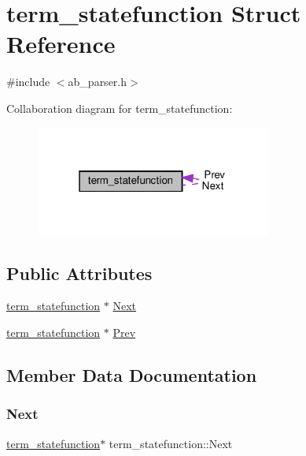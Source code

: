\hypertarget{structterm__statefunction}{}\section{term\+\_\+statefunction Struct Reference}
\label{structterm__statefunction}


{\ttfamily \#include $<$ab\+\_\+parser.\+h$>$}



Collaboration diagram for term\+\_\+statefunction\+:\nopagebreak
\begin{figure}[H]
\begin{center}
\leavevmode
\includegraphics[width=220pt]{dd/d3e/structterm__statefunction__coll__graph}
\end{center}
\end{figure}
\subsection*{Public Attributes}
\begin{DoxyCompactItemize}
\item 
\hyperlink{structterm__statefunction}{term\+\_\+statefunction} $\ast$ \hyperlink{structterm__statefunction_a326dae1852433ae2fc11195dd1770ddf}{Next}
\item 
\hyperlink{structterm__statefunction}{term\+\_\+statefunction} $\ast$ \hyperlink{structterm__statefunction_a2693cbcd59a8a1eea7cbc1f8a61efc83}{Prev}
\end{DoxyCompactItemize}


\subsection{Member Data Documentation}
\mbox{\label{structterm__statefunction_a326dae1852433ae2fc11195dd1770ddf}} 
\subsubsection{\texorpdfstring{Next}{Next}}
{\footnotesize\ttfamily \hyperlink{structterm__statefunction}{term\+\_\+statefunction}$\ast$ term\+\_\+statefunction\+::\+Next}

